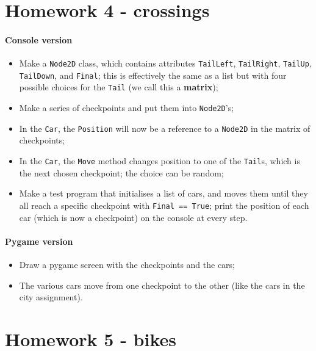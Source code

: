 \documentclass[12pt,a4paper,draft]{article}
\begin{document}
	\section{Homework 4 - crossings}
		\paragraph*{Console version}
			\begin{itemize}
				\item Make a \texttt{Node2D} class, which contains attributes \texttt{TailLeft}, \texttt{TailRight}, \texttt{TailUp}, \texttt{TailDown}, and \texttt{Final}; this is effectively the same as a list but with four possible choices for the \texttt{Tail} (we call this a \textbf{matrix});
				\item Make a series of checkpoints and put them into \texttt{Node2D}'s;
				\item In the \texttt{Car}, the \texttt{Position} will now be a reference to a \texttt{Node2D} in the matrix of checkpoints;
				\item In the \texttt{Car}, the \texttt{Move} method changes position to one of the \texttt{Tail}s, which is the next chosen checkpoint; the choice can be random;
				\item Make a test program that initialises a list of cars, and moves them until they all reach a specific checkpoint with \texttt{Final == True}; print the position of each car (which is now a checkpoint) on the console at every step.
			\end{itemize}
			
		\paragraph*{Pygame version}
			\begin{itemize}
				\item Draw a pygame screen with the checkpoints and the cars;
				\item The various cars move from one checkpoint to the other (like the cars in the city assignment).
			\end{itemize}

	\section{Homework 5 - bikes}
\end{document}

